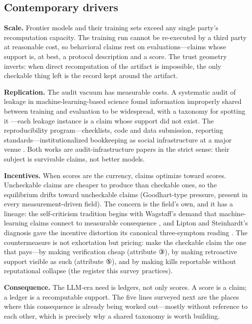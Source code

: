 \documentclass[11pt,a4paper]{article}
\begin{document}
\subsection{Contemporary drivers}

\textbf{Scale.} Frontier models and their training sets exceed any single party's recomputation capacity. The training run cannot be re-executed by a third party at reasonable cost, so behavioral claims rest on evaluations—claims whose support is, at best, a protocol description and a score. The trust geometry inverts: when direct recomputation of the artifact is impossible, the only checkable thing left is the record kept around the artifact.

\textbf{Replication.} The audit vacuum has measurable costs. A systematic audit of leakage in machine-learning-based science found information improperly shared between training and evaluation to be widespread, with a taxonomy for spotting it \cite{key07}—each leakage instance is a claim whose support did not exist. The reproducibility program—checklists, code and data submission, reporting standards—institutionalized bookkeeping as social infrastructure at a major venue \cite{key08}. Both works are audit-infrastructure papers in the strict sense: their subject is survivable claims, not better models.

\textbf{Incentives.} When scores are the currency, claims optimize toward scores. Uncheckable claims are cheaper to produce than checkable ones, so the equilibrium drifts toward uncheckable claims (Goodhart-type pressure, present in every measurement-driven field). The concern is the field's own, and it has a lineage: the self-criticism tradition begins with Wagstaff's demand that machine-learning claims connect to measurable consequence \cite{key25}, and Lipton and Steinhardt's diagnosis gave the incentive distortion its canonical three-symptom reading \cite{key26}. The countermeasure is not exhortation but pricing: make the checkable claim the one that pays—by making verification cheap (attribute ③), by making retroactive support visible as such (attribute ⑤), and by making kills reportable without reputational collapse (the register this survey practices).

\textbf{Consequence.} The LLM-era need is ledgers, not only scores. A score is a claim; a ledger is a recomputable support. The five lines surveyed next are the places where this consequence is already being worked out—mostly without reference to each other, which is precisely why a shared taxonomy is worth building.
\end{document}
